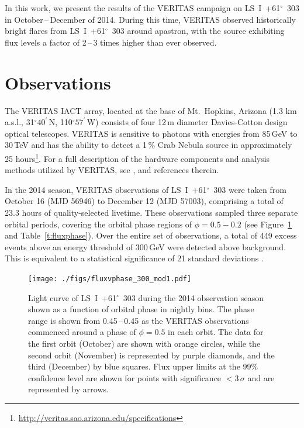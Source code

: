 \documentclass[preprint2]{aastex}
\newcommand{\lsi}{LS~I~+61$^{\circ}$~303}
\newcommand{\gev}{\,GeV}
\newcommand{\tev}{\,TeV}
\begin{document}
In this work, we present the results of the VERITAS campaign on \lsi{} in October\,--\,December of 2014. During this time, VERITAS observed historically bright flares from \lsi{} around apastron, with the source exhibiting flux levels a factor of 2\,--\,3 times higher than ever observed.

\section{Observations}
The VERITAS IACT array, located at the base of Mt.\ Hopkins, Arizona (1.3 km a.s.l., 31$^{\circ}40^\prime$\,N, 110$^{\circ}57^\prime$\,W) consists of four 12\,m diameter Davies-Cotton design optical telescopes. VERITAS is sensitive to photons with energies from 85\gev{} to 30\tev{} and has the ability to detect a 1\,\% Crab Nebula source in approximately 25 hours\footnote{\url{http://veritas.sao.arizona.edu/specifications}}. For a full description of the hardware components and analysis methods utilized by VERITAS, see \citet{VERITAS, KiedaVTSUpgrade, VERITASLSIDetection}, and references therein.

In the 2014 season, VERITAS observations of \lsi{} were taken from October 16 (MJD 56946) to  December 12 (MJD 57003), comprising a total of 23.3 hours of quality-selected livetime. These observations sampled three separate orbital periods, covering the orbital phase regions of $\phi = 0.5-0.2$ (see Figure~\ref{f:fluxphase} and Table~\ref{t:fluxphase}). Over the entire set of observations, a total of 449 excess events above an energy threshold of 300\gev{} were detected above background. This is equivalent to a statistical significance of 21 standard deviations \citep[$21\sigma$, calculated using Equation 17 of][]{LiMa}.

\begin{figure}[ht]
\centering
\texttt{[image: ./figs/fluxvphase\_300\_mod1.pdf]}
\caption{Light curve of \lsi{} during the 2014 observation season shown as a function of orbital phase in nightly bins. %
The phase range is shown from 0.45\,--\,0.45 as the VERITAS observations commenced around a phase of $\phi=0.5$ in each orbit. The data for the first orbit (October) are shown with orange circles, while the second orbit (November) is represented by purple diamonds, and the third (December) by blue squares. Flux upper limits at the 99\% confidence level \citep[using the unbounded approach of][]{Rolke} are shown for points with significance $<3\,\sigma$ and are represented by arrows.
}
\label{f:fluxphase}
\end{figure}
\end{document}
